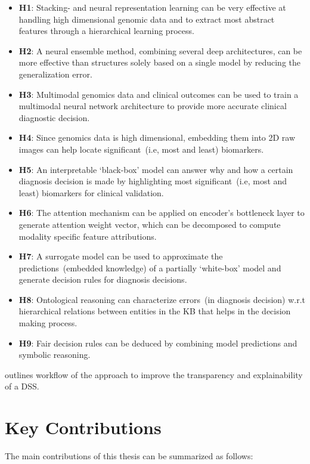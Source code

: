 \begin{itemize}[noitemsep]
    \item \textbf{H1}: Stacking- and neural representation learning can be very effective at handling high dimensional genomic data and to extract most abstract features through a hierarchical learning process. 
    \item \textbf{H2}: A neural ensemble method, combining several deep architectures, can be more effective than structures solely based on a single model by reducing the generalization error. 
	\item \textbf{H3}: Multimodal genomics data and clinical outcomes can be used to train a multimodal neural network architecture to provide more accurate clinical diagnostic decision. 
    \item \textbf{H4}: Since genomics data is high dimensional, embedding them into 2D raw images can help locate significant~(i.e, most and least) biomarkers. 
    \item \textbf{H5}: An interpretable `black-box' model can answer why and how a certain diagnosis decision is made by highlighting most significant~(i.e, most and least) biomarkers for clinical validation. 
    \item \textbf{H6}: The attention mechanism can be applied on encoder's bottleneck layer to generate attention weight vector, which can be decomposed to compute modality specific feature attributions. 
    \item \textbf{H7}: A surrogate model can be used to approximate the predictions~(embedded knowledge) of a partially `white-box' model and generate decision rules for diagnosis decisions. 
    \item \textbf{H8}: Ontological reasoning can characterize errors~(in diagnosis decision) w.r.t hierarchical relations between entities in the KB that helps in the decision making process.
    \item \textbf{H9}: Fair decision rules can be deduced by combining model predictions and symbolic reasoning. 
\end{itemize}

\hspace*{3.5mm}  outlines workflow of the  approach to improve the transparency and explainability of a DSS. 

\section{Key Contributions} \label{contributions}
The main contributions of this thesis can be summarized as follows:


